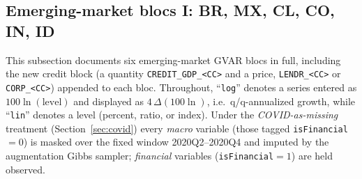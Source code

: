 
\subsection{Emerging-market blocs I: BR, MX, CL, CO, IN, ID}\label{sec:data:em1}

This subsection documents six emerging-market GVAR blocs in full, including
the new credit block (a quantity \texttt{CREDIT\_GDP\_<CC>} and a price,
\texttt{LENDR\_<CC>} or \texttt{CORP\_<CC>}) appended to each bloc. Throughout,
``\texttt{log}'' denotes a series entered as $100\ln(\text{level})$ and
displayed as $4\,\Delta(100\ln)$, i.e.\ q/q-annualized growth, while
``\texttt{lin}'' denotes a level (percent, ratio, or index). Under the
\emph{COVID-as-missing} treatment (Section~\ref{sec:covid}) every
\emph{macro} variable (those tagged \texttt{isFinancial}$=0$) is masked over
the fixed window 2020Q2--2020Q4 and imputed by the augmentation Gibbs sampler;
\emph{financial} variables (\texttt{isFinancial}$=1$) are held observed.

